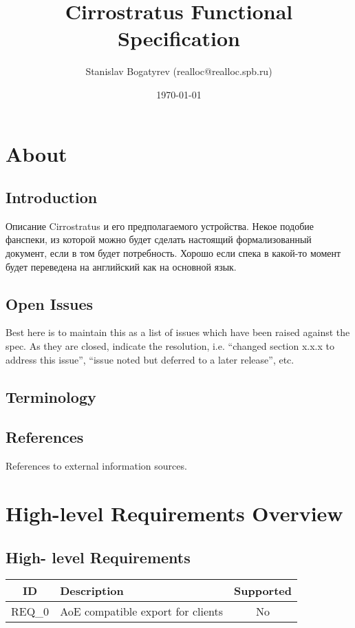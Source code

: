 \documentclass[a4paper,12pt]{article}
\title{Cirrostratus Functional Specification}
\author{Stanislav Bogatyrev (realloc@realloc.spb.ru)}
\date{\today}
\begin{document}
\maketitle
\tableofcontents

\section{About}
\subsection{Introduction}
Описание Cirrostratus и его предполагаемого устройства. Некое подобие
фанспеки, из которой можно будет сделать настоящий формализованный
документ, если в том будет потребность. Хорошо если спека в какой-то
момент будет переведена на английский как на основной язык.

\subsection{Open Issues}
Best here is to maintain this as a list of issues which have been
raised against the spec.  As they are closed, indicate the resolution,
i.e. “changed section x.x.x to address this issue”, “issue noted but
deferred to a later release”, etc.

\subsection{Terminology}

\subsection{References}
References to external information sources.

\section{High-level Requirements Overview}
\subsection{High- level Requirements}

\begin{tabular}{|c|l|c|}
\hline
ID & Description & Supported \\ \hline
REQ\_0 & AoE compatible export for clients & No\\
\hline
\end{tabular}
\end{document}
